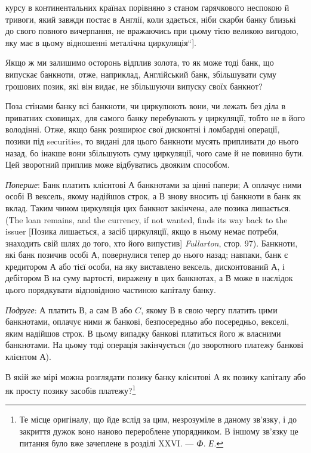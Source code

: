\parcont{}  %
курсу в континентальних країнах порівняно з станом гарячкового
неспокою й тривоги, який завжди постає в Англії, коли
здається, ніби скарби банку близькі до свого повного вичерпання,
не вражаючись при цьому тією великою вигодою, яку
має в цьому відношенні металічна циркуляція“].

Якщо ж ми залишимо осторонь відплив золота, то як може
тоді банк, що випускає банкноти, отже, наприклад, Англійський
банк, збільшувати суму грошових позик, які він видає, не збільшуючи
випуску своїх банкнот?

Поза стінами банку всі банкноти, чи циркулюють вони, чи
лежать без діла в приватних сховищах, для самого банку перебувають
у циркуляції, тобто не в його володінні. Отже, якщо
банк розширює свої дисконтні і ломбардні операції, позики під
securities, то видані для цього банкноти мусять припливати до
нього назад, бо інакше вони збільшують суму циркуляції, чого
саме й не повинно бути. Цей зворотний приплив може відбуватись
двояким способом.

\emph{Поперше}: Банк платить клієнтові $А$ банкнотами за цінні папери;
$А$ оплачує ними особі $В$ вексель, якому надійшов строк,
а $В$ знову вносить ці банкноти в банк як вклад. Таким чином
циркуляція цих банкнот закінчена, але позика лишається. (The
loan remains, and the currency, if not wanted, finds its way back
to the issuer [Позика лишається, а засіб циркуляції, якщо в ньому
немає потреби, знаходить свій шлях до того, хто його випустив]
\emph{Fullarton}, стор. 97). Банкноти, які банк позичив особі $А$, повернулися
тепер до нього назад; навпаки, банк є кредитором $А$
або тієї особи, на яку виставлено вексель, дисконтований $А$,
і дебітором $В$ на суму вартості, виражену в цих банкнотах,
а $В$ може в наслідок цього порядкувати відповідною частиною
капіталу банку.

\emph{Подруге}: $А$ платить $В$, а сам $В$ або $C$, якому $В$ в свою чергу
платить цими банкнотами, оплачує ними ж банкові, безпосередньо
або посередньо, векселі, яким надійшов строк. В цьому
випадку банкові платиться його ж власними банкнотами. На
цьому тоді операція закінчується (до зворотного платежу банкові
клієнтом $А$).

В якій же мірі можна розглядати позику банку клієнтові $А$
як позику капіталу або як просту позику засобів платежу?\footnote{
Те місце оригіналу, що йде вслід за цим, незрозуміле в даному зв’язку,
і до закриття дужок воно наново перероблене упорядником. В іншому зв’язку
це питання було вже зачеплене в розділі XXVI. — \emph{Ф. Е.}
}

